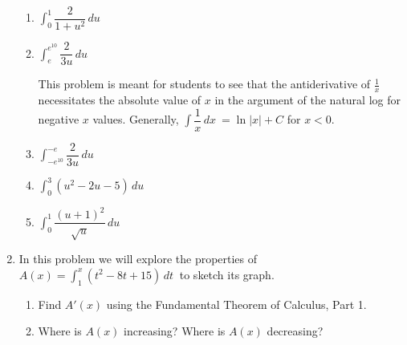 \documentclass{article}
\begin{document}
\begin{enumerate}
\begin{enumerate}
    \item $\displaystyle \int_{0}^{1} \dfrac{2}{1+u^2}\,du\ $
        \vfill 
         \newpage
    \item $\displaystyle \int_{e}^{e^{10}} \dfrac{2}{3u}\,du\ $
        \vfill
        \begin{workshop}
            This problem is meant for students to see that the antiderivative of $\frac{1}{x}$ necessitates the absolute value of $x$ in the argument of the natural log for negative $x$ values. Generally, $\displaystyle \int \dfrac{1}{x}\,dx\ = \ln {|x|} +C$ for $x<0$.
        \end{workshop}
    \item $\displaystyle \int_{-e^{10}}^{-e} \dfrac{2}{3u}\,du\ $
    \vfill
    \item $\displaystyle \int_{0}^{3} (u^2-2u-5)\,du\ $
    \vfill
    \item $\displaystyle \int_{0}^{1} \dfrac{(u+1)^2}{\sqrt{u}}\,du\ $
    \vfill
        \end{enumerate}
        \newpage
    \item In this problem we will explore the properties of $A(x)=\displaystyle \int_{1}^{x} (t^2-8t+15)\,dt\ $ to sketch its graph.
    \begin{enumerate}
        \item Find $A'(x)$ using the Fundamental Theorem of Calculus, Part 1. 
        \solonly{\textcolor{red}{$A'(x)=x^2-8x+15$}}
        \vfill
        \item Where is $A(x)$ increasing? Where is $A(x)$ decreasing?
        

\end{enumerate}
\end{enumerate}
\end{document}

